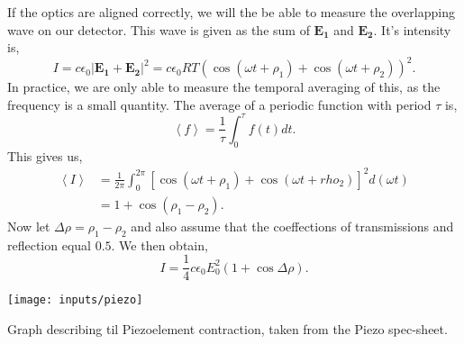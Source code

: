 \documentclass[working, oneside]{inputs/tuftebook}
\begin{document}
If the optics are aligned correctly, we will the be able to measure the overlapping wave on our detector. This wave is given as the sum of $\bm{E_1}$ and $\bm{E_2}$. It's intensity is,
\[
I = c\epsilon_0 \left| \bm{E_1}+\bm{E_2} \right| ^2 = c\epsilon_0RT \left( \cos\left( \omega t +\rho_1 \right) +\cos\left( \omega t +\rho_2 \right)   \right)^2
.\] 
In practice, we are only able to measure the temporal averaging of this, as the frequency is a small quantity. The average of a periodic function with period $\tau$ is,
\[
\left<f \right> = \frac{1}{\tau} \int_{0}^{\tau}f\left( t \right) dt  
.\]
This gives us,
\begin{align*}
\left<I \right> &=  \frac{1}{2\pi} \int_{0}^{2\pi} \left[ \cos\left( \omega t + \rho_1 \right) + \cos\left( \omega t + rho_2 \right)   \right] ^2 d \left( \omega t \right)  \\
&=  1+ \cos\left( \rho _1 - \rho_2  \right)  
.\end{align*}
Now let $ \Delta \rho = \rho_1 - \rho_2$ and also assume that the coeffections of transmissions and reflection equal $0.5$. We then obtain,
 \[
I = \frac{1}{4}c\epsilon_0 E_0^2 \left( 1 + \cos \Delta \rho  \right) 
.\]
\begin{marginfigure}
	\centering
	\texttt{[image: inputs/piezo]}
	\caption{Graph describing til Piezoelement contraction, taken from the Piezo spec-sheet.}
	\label{fig:}
\end{marginfigure}
\end{document}

